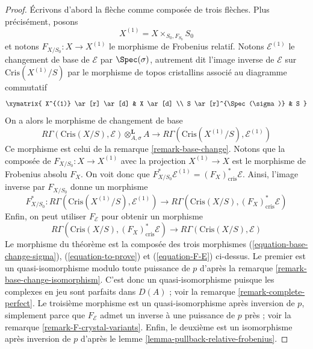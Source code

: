 \begin{proof}
Écrivons d'abord la flèche comme composée de trois flèches.
Plus précisément, posons
$$
X^{(1)} = X \times_{S_0, F_{S_0}} S_0
$$
et notons $F_{X/S_0} : X \to X^{(1)}$ le morphisme de Frobenius relatif.
Notons $\mathcal{E}^{(1)}$ le changement de base de $\mathcal{E}$
par $\Spec(\sigma)$, autrement dit l'image inverse de $\mathcal{E}$
sur $\text{Cris}(X^{(1)}/S)$ par le morphisme de topos cristallins
associé au diagramme commutatif
$$
\xymatrix{
X^{(1)} \ar[r] \ar[d] & X \ar[d] \\
S \ar[r]^{\Spec(\sigma)} & S
}
$$
On a alors le morphisme de changement de base
\begin{equation}
\label{equation-base-change-sigma}
R\Gamma(\text{Cris}(X/S), \mathcal{E}) \otimes^\mathbf{L}_{A, \sigma} A
\longrightarrow
R\Gamma(\text{Cris}(X^{(1)}/S), \mathcal{E}^{(1)})
\end{equation}
Ce morphisme est celui de la remarque \ref{remark-base-change}. Notons que la composée
de $F_{X/S_0} : X \to X^{(1)}$ avec la projection $X^{(1)} \to X$
est le morphisme de Frobenius absolu $F_X$. On voit donc que
$F_{X/S_0}^*\mathcal{E}^{(1)} = (F_X)_{\text{cris}}^*\mathcal{E}$.
Ainsi, l'image inverse par $F_{X/S_0}$ donne un morphisme
\begin{equation}
\label{equation-to-prove}
F_{X/S_0}^* :
R\Gamma(\text{Cris}(X^{(1)}/S), \mathcal{E}^{(1)})
\longrightarrow
R\Gamma(\text{Cris}(X/S), (F_X)^*_{\text{cris}}\mathcal{E})
\end{equation}
Enfin, on peut utiliser $F_\mathcal{E}$ pour obtenir un morphisme
\begin{equation}
\label{equation-F-E}
R\Gamma(\text{Cris}(X/S), (F_X)^*_{\text{cris}}\mathcal{E})
\longrightarrow
R\Gamma(\text{Cris}(X/S), \mathcal{E})
\end{equation}
Le morphisme du théorème est la composée des trois morphismes
(\ref{equation-base-change-sigma}), (\ref{equation-to-prove}) et
(\ref{equation-F-E}) ci-dessus. Le premier est un
quasi-isomorphisme modulo toute puissance de $p$ d'après la
remarque \ref{remark-base-change-isomorphism}.
C'est donc un quasi-isomorphisme puisque les complexes en jeu sont parfaits
dans $D(A)$ ; voir la remarque \ref{remark-complete-perfect}.
Le troisième morphisme est un quasi-isomorphisme après inversion de $p$, simplement
parce que $F_\mathcal{E}$ admet un inverse à une puissance de $p$ près ; voir la
remarque \ref{remark-F-crystal-variants}.
Enfin, le deuxième est un isomorphisme après inversion de $p$
d'après le lemme \ref{lemma-pullback-relative-frobenius}.
\end{proof}












